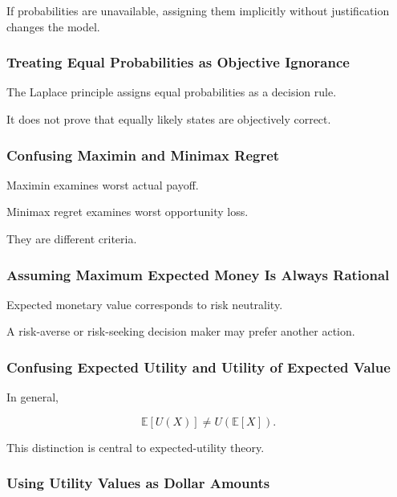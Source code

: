 If probabilities are unavailable, assigning them implicitly without
justification changes the model.

\subsubsection{Treating Equal Probabilities as Objective Ignorance}

The Laplace principle assigns equal probabilities as a decision rule.

It does not prove that equally likely states are objectively correct.

\subsubsection{Confusing Maximin and Minimax Regret}

Maximin examines worst actual payoff.

Minimax regret examines worst opportunity loss.

They are different criteria.

\subsubsection{Assuming Maximum Expected Money Is Always Rational}

Expected monetary value corresponds to risk neutrality.

A risk-averse or risk-seeking decision maker may prefer another action.

\subsubsection{Confusing Expected Utility and Utility of Expected Value}

In general,

\[
\boxed{
\mathbb{E}[U(X)]
\neq
U(\mathbb{E}[X]).
}
\]

This distinction is central to expected-utility theory.

\subsubsection{Using Utility Values as Dollar Amounts}

